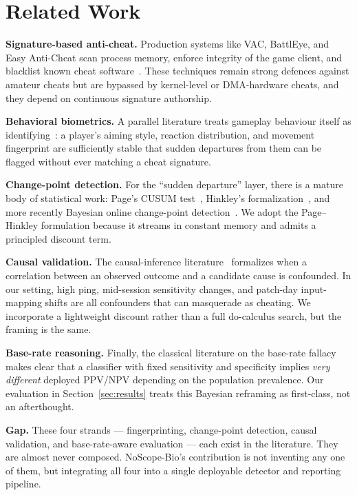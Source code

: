 \documentclass[conference,10pt]{IEEEtran}
\begin{document}
\section{Related Work}

\textbf{Signature-based anti-cheat.} Production systems like VAC,
BattlEye, and Easy Anti-Cheat scan process memory, enforce integrity of
the game client, and blacklist known cheat software~\cite{valve2018vac}.
These techniques remain strong defences against amateur cheats but are
bypassed by kernel-level or DMA-hardware cheats, and they depend on
continuous signature authorship.

\textbf{Behavioral biometrics.} A parallel literature treats gameplay
behaviour itself as identifying~\cite{yeung2006anti,shi2011smart}: a
player's aiming style, reaction distribution, and movement fingerprint
are sufficiently stable that sudden departures from them can be
flagged without ever matching a cheat signature.

\textbf{Change-point detection.} For the ``sudden departure'' layer,
there is a mature body of statistical work: Page's CUSUM
test~\cite{page1954continuous}, Hinkley's formalization~\cite{hinkley1971inference},
and more recently Bayesian online change-point detection~\cite{adams2007bayesian}.
We adopt the Page--Hinkley formulation because it streams in constant
memory and admits a principled discount term.

\textbf{Causal validation.} The causal-inference
literature~\cite{pearl2009causality,sharma2020dowhy} formalizes when a
correlation between an observed outcome and a candidate cause is
confounded. In our setting, high ping, mid-session sensitivity changes,
and patch-day input-mapping shifts are all confounders that can
masquerade as cheating. We incorporate a lightweight discount rather
than a full do-calculus search, but the framing is the same.

\textbf{Base-rate reasoning.} Finally, the classical literature on the
base-rate fallacy~\cite{tversky1974judgment,bar1980base} makes clear
that a classifier with fixed sensitivity and specificity implies
\emph{very different} deployed PPV/NPV depending on the population
prevalence. Our evaluation in Section~\ref{sec:results} treats this
Bayesian reframing as first-class, not an afterthought.

\textbf{Gap.} These four strands --- fingerprinting, change-point
detection, causal validation, and base-rate-aware evaluation --- each
exist in the literature. They are almost never composed. NoScope-Bio's
contribution is not inventing any one of them, but integrating all four
into a single deployable detector and reporting pipeline.
\end{document}
